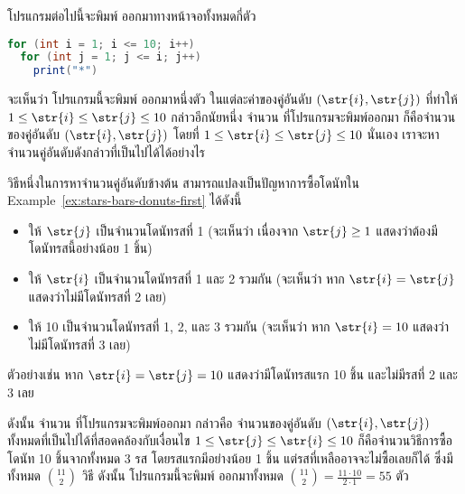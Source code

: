 \begin{example}
โปรแกรมต่อไปนี้จะพิมพ์ \str{*} ออกมาทางหน้าจอทั้งหมดกี่ตัว
\begin{lstlisting}[language=java]
for (int i = 1; i <= 10; i++)
  for (int j = 1; j <= i; j++)
    print("*")
\end{lstlisting}

จะเห็นว่า โปรแกรมนี้จะพิมพ์ \str{*} ออกมาหนึ่งตัว ในแต่ละค่าของคู่อันดับ $(\str{i},\str{j})$ ที่ทำให้ $1\leq \str{i}\leq \str{j}\leq 10$ \enskip กล่าวอีกนัยหนึ่ง จำนวน \str{*} ที่โปรแกรมจะพิมพ์ออกมา ก็คือจำนวนของคู่อันดับ $(\str{i},\str{j})$ โดยที่ $1\leq\str{i}\leq\str{j}\leq 10$ นั่นเอง \enskip เราจะหาจำนวนคู่อันดับดังกล่าวที่เป็นไปได้ได้อย่างไร

วิธีหนึ่งในการหาจำนวนคู่อันดับข้างต้น สามารถแปลงเป็นปัญหาการซื้อโดนัทใน Example~\ref{ex:stars-bars-donuts-first} ได้ดังนี้
\begin{itemize}[]
\item ให้ $\str{j}$ เป็นจำนวนโดนัทรสที่ 1 (จะเห็นว่า เนื่องจาก $\str{j}\geq 1$ แสดงว่าต้องมีโดนัทรสนี้อย่างน้อย 1 ชิ้น)
\item ให้ $\str{i}$ เป็นจำนวนโดนัทรสที่ 1 และ 2 รวมกัน (จะเห็นว่า หาก $\str{i}=\str{j}$ แสดงว่าไม่มีโดนัทรสที่ 2 เลย)
\item ให้ 10 เป็นจำนวนโดนัทรสที่ 1, 2, และ 3 รวมกัน (จะเห็นว่า หาก $\str{i}=10$ แสดงว่าไม่มีโดนัทรสที่ 3 เลย)
\end{itemize}
ตัวอย่างเช่น หาก $\str{i}=\str{j}=10$ แสดงว่ามีโดนัทรสแรก 10 ชิ้น และไม่มีรสที่ 2 และ 3 เลย

ดังนั้น จำนวน \str{*} ที่โปรแกรมจะพิมพ์ออกมา กล่าวคือ จำนวนของคู่อันดับ $(\str{i},\str{j})$ ทั้งหมดที่เป็นไปได้ที่สอดคล้องกับเงื่อนไข $1\leq\str{j}\leq\str{i}\leq 10$ ก็คือจำนวนวิธีการซื้อโดนัท 10 ชิ้นจากทั้งหมด 3 รส โดยรสแรกมีอย่างน้อย 1 ชิ้น แต่รสที่เหลืออาจจะไม่ซื้อเลยก็ได้ ซึ่งมีทั้งหมด $\binom{11}{2}$ วิธี \enskip ดังนั้น โปรแกรมนี้จะพิมพ์ \str{*} ออกมาทั้งหมด $\binom{11}{2}=\frac{11\cdot 10}{2\cdot 1}=55$ ตัว
\end{example}

